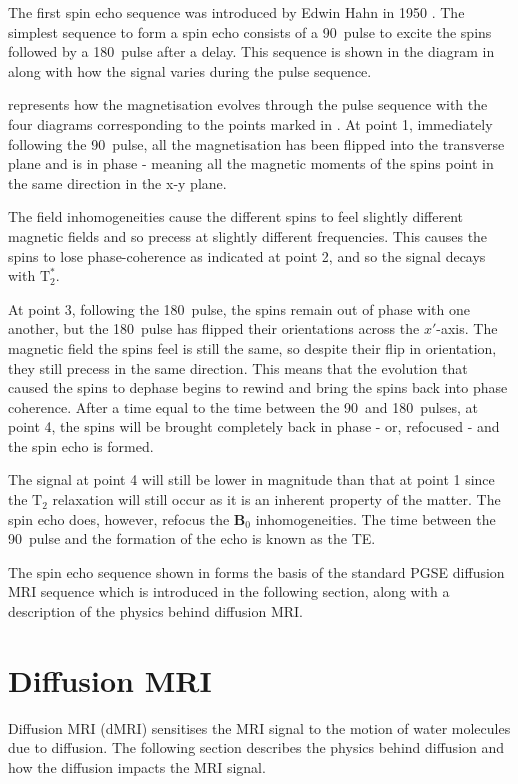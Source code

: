 The first spin echo sequence was introduced by Edwin Hahn in 1950 \cite{Hahn1950}. The simplest sequence to form a spin echo consists of a 90\degree\ pulse to excite the spins followed by a 180\degree\ pulse after a delay. 
This sequence is shown in the diagram in  along with how the signal varies during the pulse sequence.
 
 represents how the magnetisation evolves through the pulse sequence with the four diagrams corresponding to the points marked in . 
At point 1, immediately following the 90\degree\ pulse, all the magnetisation has been flipped into the transverse plane and is in phase - meaning all the magnetic moments of the spins point in the same direction in the x-y plane. 

The field inhomogeneities cause the different spins to feel slightly different magnetic fields and so precess at slightly different frequencies. 
This causes the spins to lose phase-coherence as indicated at point 2, and so the signal decays with $\mathrm{T}_2^*$.  

At point 3, following the 180\degree\ pulse, the spins remain out of phase with one another, but the 180\degree\ pulse has flipped their orientations across the $x'$-axis. 
The magnetic field the spins feel is still the same, so despite their flip in orientation, they still precess in the same direction. 
This means that the evolution that caused the spins to dephase begins to rewind and bring the spins back into phase coherence. 
After a time equal to the time between the 90\degree\ and 180\degree\ pulses, at point 4, the spins will be brought completely back in phase - or, refocused - and the spin echo is formed. 

The signal at point 4 will still be lower in magnitude than that at point 1 since the $\mathrm{T}_2$ relaxation will still occur as it is an inherent property of the matter. 
The spin echo does, however, refocus the $\mathbf{B}_0$ inhomogeneities. 
The time between the 90\degree\ pulse and the formation of the echo is known as the \ac{TE}. 

The spin echo sequence shown in  forms the basis of the standard \ac{PGSE} diffusion MRI sequence which is introduced in the following section, along with a description of the physics behind diffusion MRI. 

\section{Diffusion MRI}
\label{sec:diffusion_physics}
Diffusion MRI (dMRI) sensitises the \ac{MRI} signal to the motion of water molecules due to diffusion. The following section describes the physics behind diffusion and how the diffusion impacts the \ac{MRI} signal.

